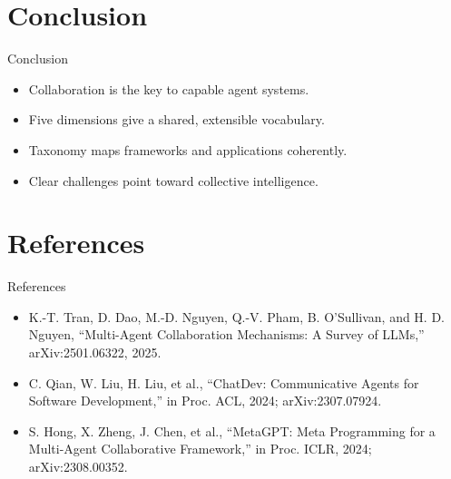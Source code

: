 \documentclass{beamer}
\begin{document}
\section{Conclusion}
\begin{frame}{Conclusion}
\begin{itemize}
  \item Collaboration is the key to capable agent systems.
  \item Five dimensions give a shared, extensible vocabulary.
  \item Taxonomy maps frameworks and applications coherently.
  \item Clear challenges point toward collective intelligence.
\end{itemize}
\end{frame}

\section{References}
\begin{frame}{References}
\footnotesize
\begin{itemize}
  \item K.-T. Tran, D. Dao, M.-D. Nguyen, Q.-V. Pham, B. O'Sullivan, and H. D. Nguyen, ``Multi-Agent Collaboration Mechanisms: A Survey of LLMs,'' arXiv:2501.06322, 2025.
  \item C. Qian, W. Liu, H. Liu, et al., ``ChatDev: Communicative Agents for Software Development,'' in Proc. ACL, 2024; arXiv:2307.07924.
  \item S. Hong, X. Zheng, J. Chen, et al., ``MetaGPT: Meta Programming for a Multi-Agent Collaborative Framework,'' in Proc. ICLR, 2024; arXiv:2308.00352.
\end{itemize}
\end{frame}
\begin{frame}\vfill{}\vfill\end{frame}
\end{document}
